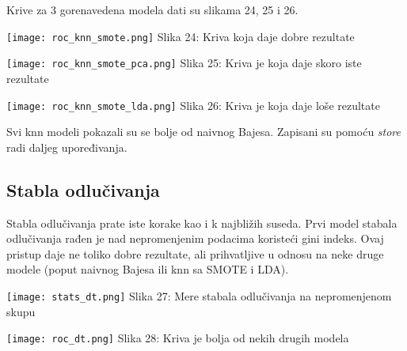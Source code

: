 \documentclass[a4paper]{article}
\begin{document}
{Krive za 3 gorenavedena modela dati su slikama 24, 25 i 26.\\

\noindent\begin{minipage}{0.35\textwidth}
\texttt{[image: roc\_knn\_smote.png]}
\hphantom{}Slika 24: Kriva koja daje dobre rezultate\\
\end{minipage}
\noindent\begin{minipage}{0.01\textwidth}
\hphantom{a}
\end{minipage}
\begin{minipage}{0.35\textwidth}
\texttt{[image: roc\_knn\_smote\_pca.png]}
\hphantom{}Slika 25: Kriva je koja daje skoro iste rezultate\\
\end{minipage}
\noindent\begin{minipage}{0.01\textwidth}
\hphantom{a}
\end{minipage}
\begin{minipage}{0.35\textwidth}
\texttt{[image: roc\_knn\_smote\_lda.png]}
\hphantom{}Slika 26: Kriva je koja daje loše rezultate\\
\end{minipage}

Svi knn modeli pokazali su se bolje od naivnog Bajesa. Zapisani su pomoću {\em store} radi daljeg upoređivanja.

\subsection{Stabla odlučivanja}
\label{dt}

Stabla odlučivanja prate iste korake kao i k najbližih suseda. Prvi model stabala odlučivanja rađen je nad nepromenjenim podacima koristeći gini indeks. Ovaj pristup daje ne toliko dobre rezultate, ali prihvatljive u odnosu na neke druge modele (poput naivnog Bajesa ili knn sa SMOTE i LDA).

\noindent\begin{minipage}{0.4\textwidth}
\texttt{[image: stats\_dt.png]}
Slika 27: Mere stabala odlučivanja na nepromenjenom skupu\\
\end{minipage}
\begin{minipage}{0.6\textwidth}
\texttt{[image: roc\_dt.png]}
\hphantom{aa}Slika 28: Kriva je bolja od nekih drugih modela\\
\end{minipage}

}
\end{document}
